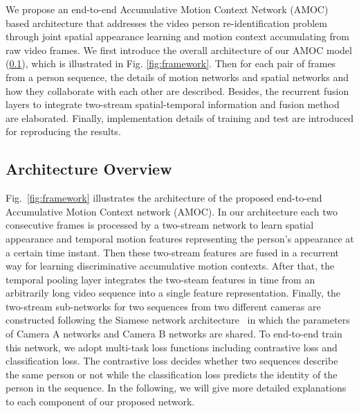 \documentclass[journal]{IEEEtran}
\begin{document}
We propose an end-to-end Accumulative Motion Context Network (AMOC) based architecture that addresses the video person re-identification problem through joint spatial appearance learning and motion context accumulating from raw video frames. We first introduce the overall architecture of our AMOC model (\ref{arch}), which is illustrated in Fig. \ref{fig:framework}. Then for each pair of frames from a person sequence, the details of motion networks and spatial networks  and how they collaborate with each other are described.  Besides, the recurrent fusion layers to integrate two-stream spatial-temporal information and fusion method are elaborated. Finally, implementation details of training and test are introduced for reproducing the results.
%
%

\subsection{Architecture Overview }\label{arch}
Fig.~\ref{fig:framework} illustrates the architecture of the proposed end-to-end Accumulative Motion Context network (AMOC). In our architecture each two consecutive frames is processed by a two-stream network to learn spatial appearance and temporal motion features representing the person's appearance at a certain time instant. Then these two-stream features are fused in a recurrent way for learning discriminative accumulative motion contexts. After that, the temporal pooling layer integrates the two-steam features in time from an arbitrarily long video sequence into a single feature representation. Finally, the two-stream sub-networks for two sequences from two different cameras are constructed following the Siamese network architecture~\cite{hadsell2006dimensionality} in which the parameters of Camera A networks and Camera B networks are shared. To end-to-end train this network, we adopt multi-task loss functions including  
contrastive loss and classification loss. The contrastive loss decides whether two sequences describe the same person or not while the classification loss predicts the identity of the person in the sequence. In the following, we will give more detailed explanations to each component of our proposed network. 
\end{document}
